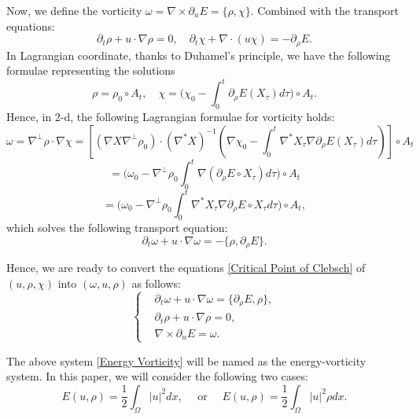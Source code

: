 \documentclass[12pt,letterpaper]{article}
\theoremstyle{plain}
\begin{document}
Now, we define the vorticity $\omega=\nabla\times \partial_u E=\{\rho,\chi\}$. Combined with the transport equations:
\begin{equation*}
 \partial_t\rho+u\cdot\nabla\rho=0,\quad \partial_t\chi+\nabla\cdot(u\chi)=-\partial_\rho E   .
\end{equation*}
In Lagrangian coordinate, thanks to Duhamel's principle, we have the following formulae representing the solutions
\begin{equation*}
\rho=\rho_0\circ A_t,\quad \chi= \bigg(\chi_0-\int_0^t \partial_\rho E(X_\tau)d\tau \bigg)\circ A_t.  
\end{equation*}
Hence, in $2$-d,  the following Lagrangian formulae for vorticity holds:
\begin{equation*}
\omega=\nabla^\perp \rho\cdot\nabla\chi= [(\nabla  X\nabla^\perp\rho_0)\cdot(\nabla^*X)^{-1}(\nabla\chi_0-\int_0^t\nabla^* X_\tau\nabla\partial_\rho E(X_\tau)d\tau )]\circ A_t
\end{equation*}
\begin{equation*}
=\bigg(\omega_0-\nabla^\perp\rho_0\int_0^t \nabla(\partial_\rho E\circ X_\tau )d\tau\bigg)\circ A_t    
\end{equation*}
\begin{equation}\label{Lagrangian Formulae of Vorticity}
=\bigg(\omega_0-\nabla^\perp\rho_0\int_0^t \nabla^*X_\tau\nabla\partial_\rho E\circ X_\tau d\tau\bigg)\circ A_t,    
\end{equation}
which solves the following transport equation:
\begin{equation*}
 \partial_t\omega+u\cdot\nabla\omega=-\{\rho,\partial_\rho E\}  . 
\end{equation*}

Hence, we are ready to convert the equations \eqref{Critical Point of Clebsch} of $(u,\rho,\chi)$ into $(\omega,u,\rho)$ as follows:
\begin{equation}\label{Energy Vorticity}
\left\{
\begin{aligned}
&\partial_t \omega+u\cdot\nabla \omega=\{\partial_\rho E,\rho\},\\
&\partial_t \rho+u\cdot\nabla\rho=0,\\
& \nabla\times\partial_uE=\omega.
\end{aligned}
\right.
\end{equation}

The above system \eqref{Energy Vorticity} will be named as the energy-vorticity system. In this paper, we will consider the following two cases:
\begin{equation*}
E(u,\rho)=\frac{1}{2}\int_\Omega\lvert u\rvert^2 dx,\quad\text{ or }\quad   E(u,\rho)=\frac{1}{2}\int_\Omega\lvert u\rvert^2 \rho dx.
\end{equation*}
\end{document}
